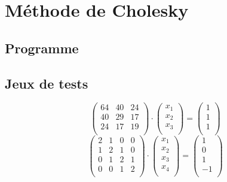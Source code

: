\documentclass{report}
\begin{document}
                
    \newpage
    \section{Méthode de Cholesky}
      \subsection{Programme}
        
      \newpage
      \subsection{Jeux de tests}
      	\begin{equation}
        \begin{pmatrix}
		  64 & 40 & 24 \\
		  40 & 29 & 17 \\
		  24 & 17 & 19 \\
        \end{pmatrix}
        \cdot
        \begin{pmatrix}
          x_1 \\
          x_2 \\
          x_3 \\
        \end{pmatrix}
        =
        \begin{pmatrix}
          1 \\
          1 \\
          1 \\
        \end{pmatrix}
        \end{equation}
        \begin{equation}
        \begin{pmatrix}
		  2 & 1 & 0 & 0 \\
		  1 & 2 & 1 & 0 \\
		  0 & 1 & 2 & 1 \\
		  0 & 0 & 1 & 2 \\
        \end{pmatrix}
        \cdot
        \begin{pmatrix}
          x_1 \\
          x_2 \\
          x_3 \\
          x_4 \\
        \end{pmatrix}
        =
        \begin{pmatrix}
          1 \\
          0 \\
          1 \\
          -1 \\
        \end{pmatrix}
        \end{equation}
\end{document}
